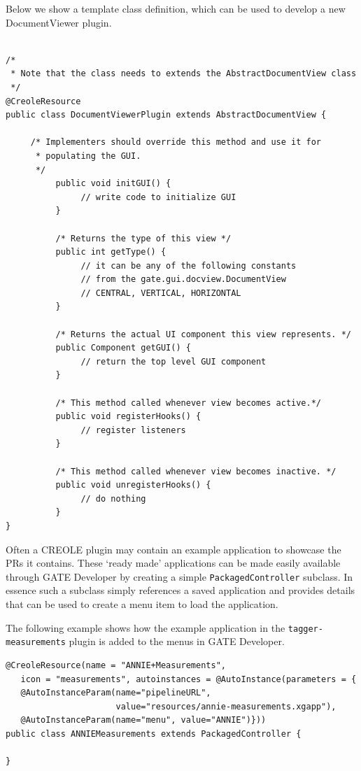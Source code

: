 Below we show a template class definition, which can be used to develop a new
DocumentViewer plugin.

\begin{lstlisting}

/*
 * Note that the class needs to extends the AbstractDocumentView class
 */
@CreoleResource
public class DocumentViewerPlugin extends AbstractDocumentView {

     /* Implementers should override this method and use it for
      * populating the GUI.
      */
          public void initGUI() {
               // write code to initialize GUI   
          }

          /* Returns the type of this view */
          public int getType() {
               // it can be any of the following constants 
               // from the gate.gui.docview.DocumentView
               // CENTRAL, VERTICAL, HORIZONTAL
          }

          /* Returns the actual UI component this view represents. */
          public Component getGUI() {
               // return the top level GUI component 
          }

          /* This method called whenever view becomes active.*/
          public void registerHooks() {
               // register listeners
          }

          /* This method called whenever view becomes inactive. */
          public void unregisterHooks() {
               // do nothing
          }
}
\end{lstlisting}


Often a CREOLE plugin may contain an example application to showcase the
PRs it contains. These `ready made' applications can be made easily available
through GATE Developer by creating a simple {\tt PackagedController} subclass.
In essence such a subclass simply references a saved application and provides
details that can be used to create a menu item to load the application.

The following example shows how the example application in the
{\tt tagger-measurements} plugin is added to the menus in GATE Developer.

\begin{lstlisting}
@CreoleResource(name = "ANNIE+Measurements",
   icon = "measurements", autoinstances = @AutoInstance(parameters = {
   @AutoInstanceParam(name="pipelineURL",
                      value="resources/annie-measurements.xgapp"),
   @AutoInstanceParam(name="menu", value="ANNIE")}))
public class ANNIEMeasurements extends PackagedController {

}
\end{lstlisting}

